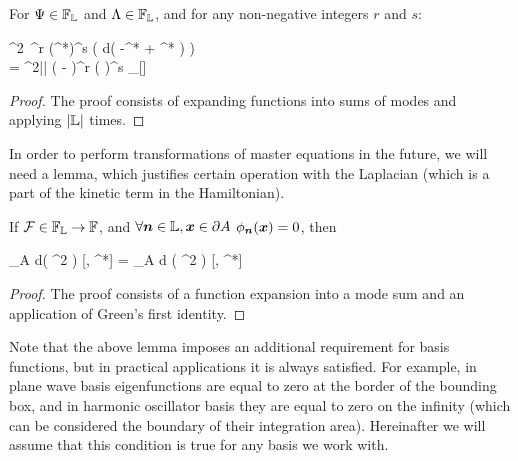 \begin{lemma}
\label{lmm:func-calculus:fourier-of-moments}
	For $\Psi \in \mathbb{F}_{\mathbb{L}}$ and $\Lambda \in \mathbb{F}_{\mathbb{L}}$, and for any non-negative integers $r$ and $s$:
	\begin{eqn*}
		\int \delta^2\Psi\, \Psi^r (\Psi^*)^s \exp \left(
				\int d\xvec \left( -\Lambda \Psi^* + \Lambda^* \Psi \right)
			\right) \\
		= \pi^{2|\restbasis|}
			\left( -\frac{\delta}{\delta \Lambda^*} \right)^r
			\left( \frac{\delta}{\delta \Lambda} \right)^s
			\Delta_{\restbasis}[\Lambda]
	\end{eqn*}
\end{lemma}
\begin{proof}
The proof consists of expanding functions into sums of modes and applying  $|\mathbb{L}|$ times.
\end{proof}

In order to perform transformations of master equations in the future, we will need a lemma, which justifies certain operation with the Laplacian (which is a part of the kinetic term in the Hamiltonian).

\begin{lemma}
\label{lmm:func-calculus:move-laplacian}
	If $\mathcal{F} \in \mathbb{F}_{\mathbb{L}} \rightarrow \mathbb{F}$, and $\forall \boldsymbol{n} \in \mathbb{L}, \boldsymbol{x} \in \partial A$ $\phi_{\boldsymbol{n}}(\boldsymbol{x}) = 0$, then
	\begin{eqn*}
		\int\limits_A d\xvec \left(
			\nabla^2 \frac{\delta}{\delta \Psi}
		\right) \Psi {}[\Psi, \Psi^*]
		= \int\limits_A d\xvec \frac{\delta}{\delta \Psi}
		( \nabla^2 \Psi ) [\Psi, \Psi^*]
	\end{eqn*}
\end{lemma}
\begin{proof}
The proof consists of a function expansion into a mode sum and an application of Green's first identity.
\end{proof}

Note that the above lemma imposes an additional requirement for basis functions, but in practical applications it is always satisfied.
For example, in plane wave basis eigenfunctions are equal to zero at the border of the bounding box, and in harmonic oscillator basis they are equal to zero on the infinity (which can be considered the boundary of their integration area).
Hereinafter we will assume that this condition is true for any basis we work with.

